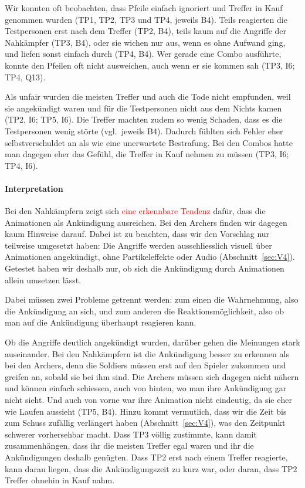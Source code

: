 \documentclass[../Main.tex]{subfiles}
\begin{document}
Wir konnten oft beobachten, dass Pfeile einfach ignoriert und Treffer in Kauf genommen wurden (TP1, TP2, TP3 und TP4, jeweils B4). Teils reagierten die Testpersonen erst nach dem Treffer (TP2, B4), teils kaum auf die Angriffe der Nahkämpfer (TP3, B4), oder sie wichen nur aus, wenn es ohne Aufwand ging, und liefen sonst einfach durch (TP4, B4). Wer gerade eine Combo ausführte, konnte den Pfeilen oft nicht ausweichen, auch wenn er sie kommen sah (TP3, I6; TP4, Q13).

Als unfair wurden die meisten Treffer und auch die Tode nicht empfunden, weil sie angekündigt waren und für die Testpersonen nicht aus dem Nichts kamen (TP2, I6; TP5, I6). Die Treffer machten zudem so wenig Schaden, dass es die Testpersonen wenig störte (vgl.\ jeweils B4). Dadurch fühlten sich Fehler eher selbstverschuldet an als wie eine unerwartete Bestrafung. Bei den Combos hatte man dagegen eher das Gefühl, die Treffer in Kauf nehmen zu müssen (TP3, I6; TP4, I6).

\paragraph{Interpretation}
Bei den Nahkämpfern zeigt sich \textcolor{red}{eine erkennbare Tendenz} dafür, dass die Animationen als Ankündigung ausreichen. Bei den Archers finden wir dagegen kaum Hinweise darauf. Dabei ist zu beachten, dass wir den Vorschlag nur teilweise umgesetzt haben: Die Angriffe werden ausschliesslich visuell über Animationen angekündigt, ohne Partikeleffekte oder Audio (Abschnitt~\ref{sec:V4}). Getestet haben wir deshalb nur, ob sich die Ankündigung durch Animationen allein umsetzen lässt.

Dabei müssen zwei Probleme getrennt werden: zum einen die Wahrnehmung, also die Ankündigung an sich, und zum anderen die Reaktionsmöglichkeit, also ob man auf die Ankündigung überhaupt reagieren kann.

Ob die Angriffe deutlich angekündigt wurden, darüber gehen die Meinungen stark auseinander. Bei den Nahkämpfern ist die Ankündigung besser zu erkennen als bei den Archers, denn die Soldiers müssen erst auf den Spieler zukommen und greifen an, sobald sie bei ihm sind. Die Archers müssen sich dagegen nicht nähern und können einfach schiessen, auch von hinten, wo man ihre Ankündigung gar nicht sieht. Und auch von vorne war ihre Animation nicht eindeutig, da sie eher wie Laufen aussieht (TP5, B4). Hinzu kommt vermutlich, dass wir die Zeit bis zum Schuss zufällig verlängert haben (Abschnitt~\ref{sec:V4}), was den Zeitpunkt schwerer vorhersehbar macht. Dass TP3 völlig zustimmte, kann damit zusammenhängen, dass ihr die meisten Treffer egal waren und ihr die Ankündigungen deshalb genügten. Dass TP2 erst nach einem Treffer reagierte, kann daran liegen, dass die Ankündigungszeit zu kurz war, oder daran, dass TP2 Treffer ohnehin in Kauf nahm.
\end{document}

